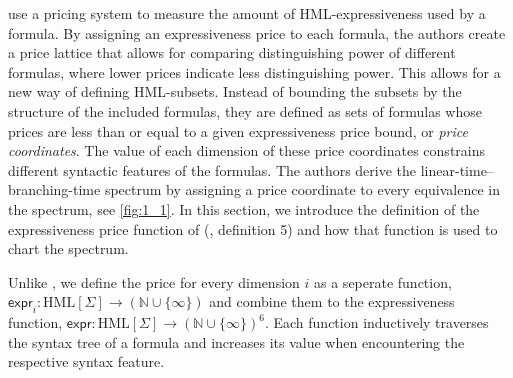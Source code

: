 %
\begin{isabellebody}%
%
%
\isadelimtheory
%
\endisadelimtheory
%
\isatagtheory
%
\endisatagtheory
{\isafoldtheory}%
%
\isadelimtheory
%
\endisadelimtheory
%
\isadelimdocument
%
\endisadelimdocument
%
\isatagdocument
%
\isamarkuptrue%
%
\endisatagdocument
{\isafolddocument}%
%
\isadelimdocument
%
\endisadelimdocument
%
\begin{isamarkuptext}%
\cite{bisping2023process, bisping2022deciding} use a pricing system to measure the amount of HML-expressiveness used by a formula. By assigning an expressiveness price to each formula, the authors create a price lattice that allows for comparing distinguishing power of different formulas, where lower prices indicate less distinguishing power. This allows for a new way of defining HML-subsets. Instead of bounding the subsets by the structure of the included formulas, they are defined as sets of formulas whose prices are less than or equal to a given expressiveness price bound, or \textit{price coordinates}.
The value of each dimension of these price coordinates constrains different syntactic features of the formulas. The authors derive the linear-time--branching-time spectrum by assigning a price coordinate to every equivalence in the spectrum, see \cref{fig:1_1}. In this section, we introduce the definition of the expressiveness price function of (\cite{bisping2023process}, definition 5) and how that function is used to chart the spectrum.%
\end{isamarkuptext}\isamarkuptrue%
%
\begin{isamarkuptext}%
Unlike \cite{bisping2023process}, we define the price for every dimension $i$ as a seperate function, $\textsf{expr}_i : \text{HML}[\Sigma] \rightarrow (\mathbb{N \cup \{\infty\}})$ and combine them to the expressiveness function, $\textsf{expr} : \text{HML}[\Sigma] \rightarrow (\mathbb{N \cup \{\infty\}})^6$. Each function inductively traverses the syntax tree of a formula and increases its value when encountering the respective syntax feature.%
\end{isamarkuptext}\isamarkuptrue%
%
\isadelimdocument
%
\endisadelimdocument
%
\isatagdocument
%
\isamarkuptrue%
%
\endisatagdocument
{\isafolddocument}%
%
\isadelimdocument
%
\endisadelimdocument
%
\begin{isamarkuptext}%
\textit{
}
\end{isamarkuptext}
\end{isabellebody}
